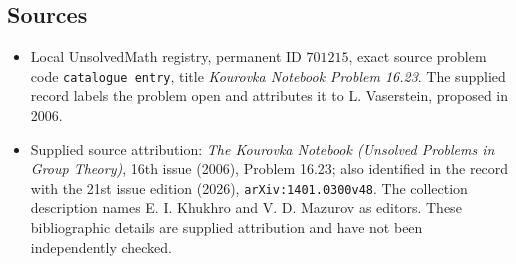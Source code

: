 \documentclass[11pt]{article}
\begin{document}
\subsection{Sources}
\begin{itemize}
\item Local UnsolvedMath registry, permanent ID \(701215\), exact source problem code \texttt{catalogue entry}, title \emph{Kourovka Notebook Problem 16.23}. The supplied record labels the problem open and attributes it to L. Vaserstein, proposed in 2006.
\item Supplied source attribution: \emph{The Kourovka Notebook (Unsolved Problems in Group Theory)}, 16th issue (2006), Problem 16.23; also identified in the record with the 21st issue edition (2026), \texttt{arXiv:1401.0300v48}. The collection description names E. I. Khukhro and V. D. Mazurov as editors. These bibliographic details are supplied attribution and have not been independently checked.
\end{itemize}
\end{document}
